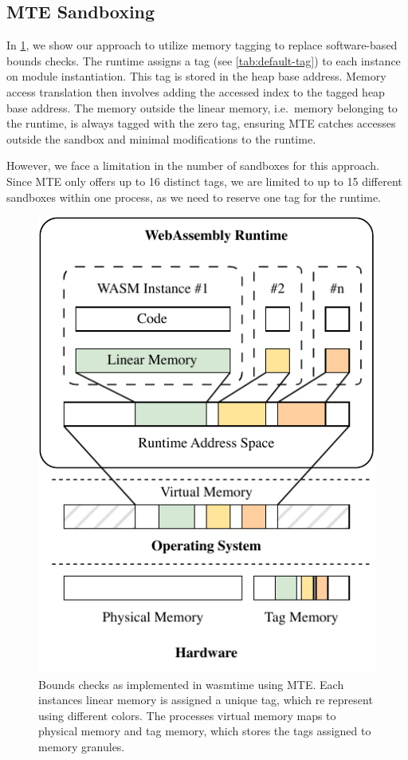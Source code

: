 \subsection{\ac{MTE} Sandboxing}
\label{subsec:bounds-checks}

In \cref{fig:system-design-sandboxing}, we show our approach to utilize memory tagging to replace software-based bounds checks.
The runtime assigns a tag (see \cref{tab:default-tag}) to each instance on module instantiation.
This tag is stored in the heap base address.
Memory access translation then involves adding the accessed index to the tagged heap base address.
The memory outside the linear memory, i.e.\ memory belonging to the runtime, is always tagged with the zero tag, ensuring \ac{MTE} catches accesses outside the sandbox and minimal modifications to the runtime.

However, we face a limitation in the number of sandboxes for this approach.
Since \ac{MTE} only offers up to 16 distinct tags, we are limited to up to 15 different sandboxes within one process, as we need to reserve one tag for the runtime.

\begin{figure}[t]
  \centering
  \includegraphics[scale=1]{figures/build/system-design-1}
  \caption{Bounds checks as implemented in wasmtime using \ac{MTE}. Each instances linear memory is assigned a unique tag, which re represent using different colors. The processes virtual memory maps to physical memory and tag memory, which stores the tags assigned to memory granules.}
  \label{fig:system-design-sandboxing}
\end{figure}

